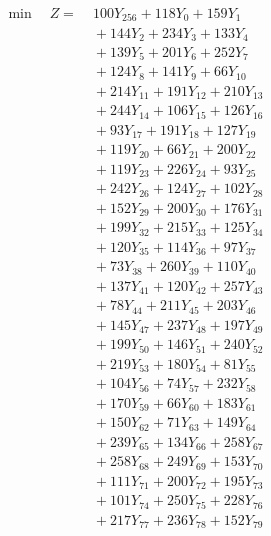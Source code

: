 \documentclass[a4paper,10pt]{article}
\begin{document}
\allowdisplaybreaks
{\small
\begin{align}
\min \quad Z = &\; 100 Y_{256} + 118 Y_{0} + 159 Y_{1} \\[0.3ex]
&\;  + 144 Y_{2} + 234 Y_{3} + 133 Y_{4} \\[0.3ex]
&\;  + 139 Y_{5} + 201 Y_{6} + 252 Y_{7} \\[0.3ex]
&\;  + 124 Y_{8} + 141 Y_{9} + 66 Y_{10} \\[0.3ex]
&\;  + 214 Y_{11} + 191 Y_{12} + 210 Y_{13} \\[0.3ex]
&\;  + 244 Y_{14} + 106 Y_{15} + 126 Y_{16} \\[0.3ex]
&\;  + 93 Y_{17} + 191 Y_{18} + 127 Y_{19} \\[0.3ex]
&\;  + 119 Y_{20} + 66 Y_{21} + 200 Y_{22} \\[0.3ex]
&\;  + 119 Y_{23} + 226 Y_{24} + 93 Y_{25} \\[0.3ex]
&\;  + 242 Y_{26} + 124 Y_{27} + 102 Y_{28} \\[0.5ex]\allowbreak
&\;  + 152 Y_{29} + 200 Y_{30} + 176 Y_{31} \\[0.3ex]
&\;  + 199 Y_{32} + 215 Y_{33} + 125 Y_{34} \\[0.3ex]
&\;  + 120 Y_{35} + 114 Y_{36} + 97 Y_{37} \\[0.3ex]
&\;  + 73 Y_{38} + 260 Y_{39} + 110 Y_{40} \\[0.3ex]
&\;  + 137 Y_{41} + 120 Y_{42} + 257 Y_{43} \\[0.3ex]
&\;  + 78 Y_{44} + 211 Y_{45} + 203 Y_{46} \\[0.3ex]
&\;  + 145 Y_{47} + 237 Y_{48} + 197 Y_{49} \\[0.3ex]
&\;  + 199 Y_{50} + 146 Y_{51} + 240 Y_{52} \\[0.3ex]
&\;  + 219 Y_{53} + 180 Y_{54} + 81 Y_{55} \\[0.3ex]
&\;  + 104 Y_{56} + 74 Y_{57} + 232 Y_{58} \\[0.5ex]\allowbreak
&\;  + 170 Y_{59} + 66 Y_{60} + 183 Y_{61} \\[0.3ex]
&\;  + 150 Y_{62} + 71 Y_{63} + 149 Y_{64} \\[0.3ex]
&\;  + 239 Y_{65} + 134 Y_{66} + 258 Y_{67} \\[0.3ex]
&\;  + 258 Y_{68} + 249 Y_{69} + 153 Y_{70} \\[0.3ex]
&\;  + 111 Y_{71} + 200 Y_{72} + 195 Y_{73} \\[0.3ex]
&\;  + 101 Y_{74} + 250 Y_{75} + 228 Y_{76} \\[0.3ex]
&\;  + 217 Y_{77} + 236 Y_{78} + 152 Y_{79} \\[0.3ex]

\end{align}}
\end{document}
